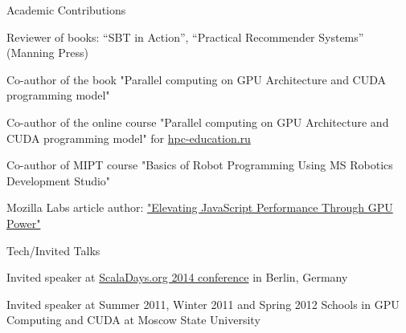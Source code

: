 \documentclass{resume} %
\begin{document}

\begin{rSubsectionSchools}{Academic Contributions}
\item Reviewer of  books: “SBT in Action”, “Practical Recommender Systems” (Manning Press)
\item Co-author of the book "Parallel computing on GPU Architecture and CUDA programming  model"
\item Co-author of the online course "Parallel computing on GPU Architecture and CUDA programming  model" for \href{http://hpc-education.ru}{hpc-education.ru}
\item Co-author of MIPT course "Basics of Robot Programming Using MS Robotics Development Studio"
\item Mozilla Labs article author: \href{http://myltsev.name/2015/06/01/Elevating-JavaScript-Performance-Through-GPU-Power/}{"Elevating JavaScript Performance Through GPU Power"}
\end{rSubsectionSchools}


\begin{rSubsectionSchools}{Tech/Invited Talks}
\item Invited speaker at \href{https://www.parleys.com/tutorial/meet-parboiled2-a-macro-based-peg-parser-generator-scala-2-10-3}{ScalaDays.org 2014 conference} in Berlin, Germany
\item Invited speaker at Summer 2011, Winter 2011 and Spring 2012 Schools in GPU Computing and CUDA at Moscow State University
\end{rSubsectionSchools}
\end{document}
